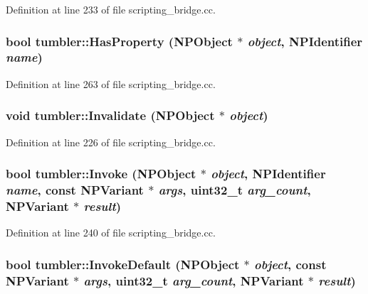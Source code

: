 Definition at line 233 of file scripting\_\-bridge.cc.

\hypertarget{namespacetumbler_a2f2417690297eb874bfa76c0d125a64e}{
\subsubsection[{HasProperty}]{\setlength{\rightskip}{0pt plus 5cm}bool tumbler::HasProperty (NPObject $\ast$ {\em object}, \/  NPIdentifier {\em name})}}
\label{namespacetumbler_a2f2417690297eb874bfa76c0d125a64e}


Definition at line 263 of file scripting\_\-bridge.cc.

\hypertarget{namespacetumbler_ab219f1f08239d2675431fd3e3299b71d}{
\subsubsection[{Invalidate}]{\setlength{\rightskip}{0pt plus 5cm}void tumbler::Invalidate (NPObject $\ast$ {\em object})}}
\label{namespacetumbler_ab219f1f08239d2675431fd3e3299b71d}


Definition at line 226 of file scripting\_\-bridge.cc.

\hypertarget{namespacetumbler_a1336a275c5d007684384b01b032dec56}{
\subsubsection[{Invoke}]{\setlength{\rightskip}{0pt plus 5cm}bool tumbler::Invoke (NPObject $\ast$ {\em object}, \/  NPIdentifier {\em name}, \/  const NPVariant $\ast$ {\em args}, \/  uint32\_\-t {\em arg\_\-count}, \/  NPVariant $\ast$ {\em result})}}
\label{namespacetumbler_a1336a275c5d007684384b01b032dec56}


Definition at line 240 of file scripting\_\-bridge.cc.

\hypertarget{namespacetumbler_a35b1cc267fcf3e0beed6b9e45caa65ef}{
\subsubsection[{InvokeDefault}]{\setlength{\rightskip}{0pt plus 5cm}bool tumbler::InvokeDefault (NPObject $\ast$ {\em object}, \/  const NPVariant $\ast$ {\em args}, \/  uint32\_\-t {\em arg\_\-count}, \/  NPVariant $\ast$ {\em result})}}
\label{namespacetumbler_a35b1cc267fcf3e0beed6b9e45caa65ef}


